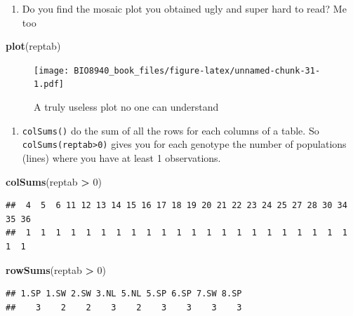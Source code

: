 \documentclass[
  12pt,
]{book}
\newenvironment{Shaded}{\begin{snugshade}}{\end{snugshade}}
\newcommand{\DecValTok}[1]{\textcolor[rgb]{0.00,0.00,0.81}{#1}}
\newcommand{\KeywordTok}[1]{\textcolor[rgb]{0.13,0.29,0.53}{\textbf{#1}}}
\newcommand{\NormalTok}[1]{#1}
\newcommand{\OperatorTok}[1]{\textcolor[rgb]{0.81,0.36,0.00}{\textbf{#1}}}
\newcommand{\StringTok}[1]{\textcolor[rgb]{0.31,0.60,0.02}{#1}}
\providecommand{\tightlist}{%
  \setlength{\itemsep}{0pt}\setlength{\parskip}{0pt}}
\begin{document}
\begin{enumerate}
\def\labelenumi{\arabic{enumi}.}
\tightlist
\item
  Do you find the mosaic plot you obtained ugly and super hard to read? Me too 🤣
\end{enumerate}

\begin{Shaded}
\begin{Highlighting}[]
\KeywordTok{plot}\NormalTok{(reptab)}
\end{Highlighting}
\end{Shaded}

\begin{figure}
\centering
\texttt{[image: BIO8940\_book\_files/figure-latex/unnamed-chunk-31-1.pdf]}
\caption{\label{fig:unnamed-chunk-31}A truly useless plot no one can understand}
\end{figure}

\begin{enumerate}
\def\labelenumi{\arabic{enumi}.}
\setcounter{enumi}{1}
\tightlist
\item
  \texttt{colSums()} do the sum of all the rows for each columns of a table. So \texttt{colSums(reptab\textgreater{}0)} gives you for each genotype the number of populations (lines) where you have at least 1 observations.
\end{enumerate}

\begin{Shaded}
\begin{Highlighting}[]
\KeywordTok{colSums}\NormalTok{(reptab }\OperatorTok{>}\StringTok{ }\DecValTok{0}\NormalTok{)}
\end{Highlighting}
\end{Shaded}

\begin{verbatim}
##  4  5  6 11 12 13 14 15 16 17 18 19 20 21 22 23 24 25 27 28 30 34 35 36 
##  1  1  1  1  1  1  1  1  1  1  1  1  1  1  1  1  1  1  1  1  1  1  1  1
\end{verbatim}

\begin{Shaded}
\begin{Highlighting}[]
\KeywordTok{rowSums}\NormalTok{(reptab }\OperatorTok{>}\StringTok{ }\DecValTok{0}\NormalTok{)}
\end{Highlighting}
\end{Shaded}

\begin{verbatim}
## 1.SP 1.SW 2.SW 3.NL 5.NL 5.SP 6.SP 7.SW 8.SP 
##    3    2    2    3    2    3    3    3    3
\end{verbatim}
\end{document}
